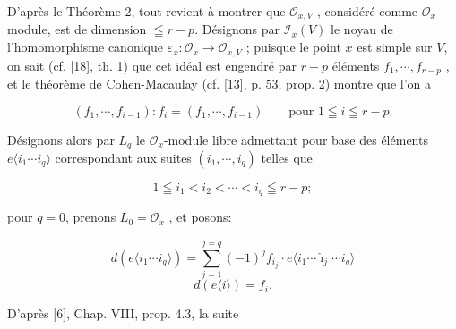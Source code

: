 D'après le Théorème 2, tout revient à montrer que $\mathcal{O}_{x,V}$ , considéré comme $\mathcal{O}_x$-module, est de dimension $\leqq r - p$. Désignons par $\mathcal{I}_x(V)$ le noyau de l'homomorphisme canonique $\varepsilon_x: \mathcal{O}_x \rightarrow \mathcal{O}_{x,V}$ ; puisque le point $x$ est simple sur $V$, on sait (cf. [18], th. 1) que cet idéal est engendré par $r - p$ éléments $f_1 , \cdots , f_{r-p}$ , et le théorème de Cohen-Macaulay (cf. [13], p. 53, prop. 2) montre que l'on a

\begin{equation*}
(f_1 , \cdots , f_{i-1}) : f_i = (f_1 , \cdots , f_{i-1}) \qquad \text{pour } 1 \leqq i \leqq r - p.
\end{equation*}

Désignons alors par $L_q$ le $\mathcal{O}_x$-module libre admettant pour base des éléments $e\langle i_1 \cdots i_q \rangle$ correspondant aux suites $(i_1 , \cdots , i_q)$ telles que

\begin{equation*}
1 \leqq i_1 < i_2 < \cdots < i_q \leqq r - p;
\end{equation*}

pour $q = 0$, prenons $L_0 = \mathcal{O}_x$ , et posons:

\begin{equation*}
d(e\langle i_1 \cdots i_q \rangle) = \sum_{j=1}^{j=q} (-1)^j f_{i_j} \cdot e\langle i_1 \cdots \hat{\imath}_j \cdots i_q \rangle
\end{equation*}
\begin{equation*}
d(e\langle i \rangle) = f_i .
\end{equation*}



%
%
%
D'après [6], Chap. VIII, prop. 4.3, la suite

